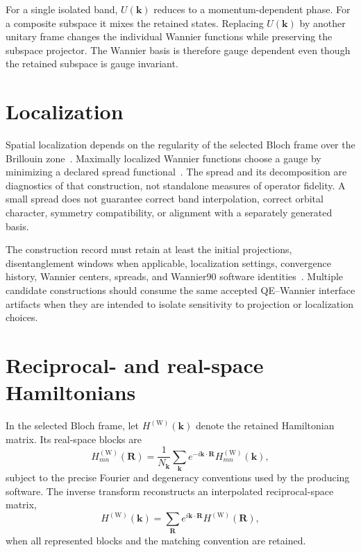 For a single isolated band, $U(\mathbf k)$ reduces to a momentum-dependent
phase. For a composite subspace it mixes the retained states. Replacing
$U(\mathbf k)$ by another unitary frame changes the individual Wannier
functions while preserving the subspace projector. The Wannier basis is
therefore gauge dependent even though the retained subspace is gauge invariant.

\section{Localization}

Spatial localization depends on the regularity of the selected Bloch frame over
the Brillouin zone~\cite{kohn1959}. Maximally localized Wannier functions choose
a gauge by minimizing a declared spread functional~\cite{marzari2012}. The
spread and its decomposition are
diagnostics of that construction, not standalone measures of operator fidelity.
A small spread does not guarantee correct band interpolation, correct orbital
character, symmetry compatibility, or alignment with a separately generated
basis.

The construction record must retain at least the initial projections,
disentanglement windows when applicable, localization settings, convergence
history, Wannier centers, spreads, and Wannier90 software
identities~\cite{pizzi2020}. Multiple candidate
constructions should consume the same accepted QE--Wannier interface artifacts
when they are intended to isolate sensitivity to projection or localization
choices.

\section{Reciprocal- and real-space Hamiltonians}

In the selected Bloch frame, let $H^{(\mathrm W)}(\mathbf k)$ denote the
retained Hamiltonian matrix. Its real-space blocks are
\begin{equation}
  H^{(\mathrm W)}_{mn}(\mathbf R)
  =
  \frac{1}{N_{\mathbf k}}
  \sum_{\mathbf k}e^{-i\mathbf k\cdot\mathbf R}
  H^{(\mathrm W)}_{mn}(\mathbf k),
\end{equation}
subject to the precise Fourier and degeneracy conventions used by the producing
software. The inverse transform reconstructs an interpolated reciprocal-space
matrix,
\begin{equation}
  H^{(\mathrm W)}(\mathbf k)
  =
  \sum_{\mathbf R}e^{i\mathbf k\cdot\mathbf R}
  H^{(\mathrm W)}(\mathbf R),
\end{equation}
when all represented blocks and the matching convention are retained.

